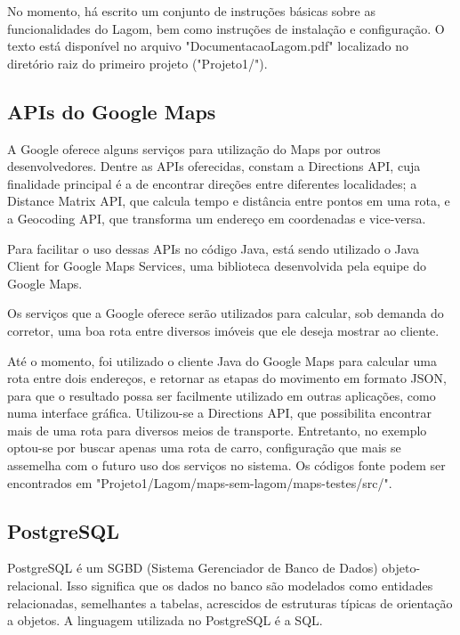 \documentclass[a4paper,11pt,fleqn]{article}
\begin{document}
No momento, há escrito um conjunto de instruções básicas sobre as funcionalidades do Lagom, bem como instruções de instalação e configuração.
 O texto está disponível no arquivo "DocumentacaoLagom.pdf" localizado no diretório raiz do primeiro projeto ("Projeto1/").


\subsection{APIs do Google Maps}
\label{ss:maps}

A Google oferece alguns serviços para utilização do Maps por outros desenvolvedores. Dentre as APIs oferecidas, constam a Directions API,
 cuja finalidade principal é a de encontrar direções entre diferentes localidades; a Distance Matrix API, que calcula tempo e distância entre
  pontos em uma rota, e a Geocoding API, que transforma um endereço em coordenadas e vice-versa.

Para facilitar o uso dessas APIs no código Java, está sendo utilizado o Java Client for Google Maps Services, uma biblioteca desenvolvida pela equipe do
 Google Maps.

Os serviços que a Google oferece serão utilizados para calcular, sob demanda do corretor, uma boa rota entre diversos imóveis que ele deseja mostrar ao
 cliente.

 Até o momento, foi utilizado o cliente Java do Google Maps para calcular uma rota entre dois endereços, e retornar as etapas do movimento em formato
  JSON, para que o resultado possa ser facilmente utilizado em outras aplicações, como numa interface gráfica. Utilizou-se a Directions API, que possibilita
   encontrar mais de uma rota para diversos meios de transporte. Entretanto, no exemplo optou-se por buscar apenas uma rota de carro, configuração que mais se assemelha
    com o futuro uso dos serviços no sistema. Os códigos fonte podem ser encontrados em "Projeto1/Lagom/maps-sem-lagom/maps-testes/src/".

\subsection{PostgreSQL}
\label{ss:postgre}

PostgreSQL é um SGBD (Sistema Gerenciador de Banco de Dados) objeto-relacional. Isso significa que os dados no banco são modelados como entidades relacionadas, semelhantes
 a tabelas, acrescidos de estruturas típicas de orientação a objetos. A linguagem utilizada no PostgreSQL é a SQL.
\end{document}
